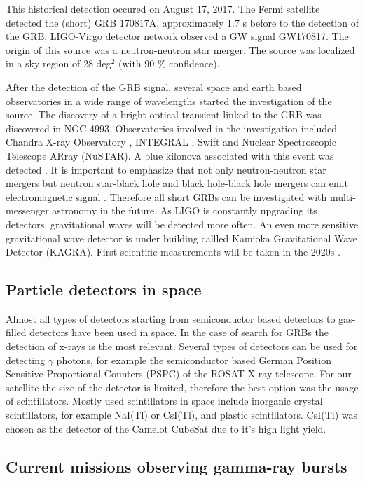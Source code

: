 \documentclass[12pt, a4paper,titlepage]{article}
\numberwithin{equation}{section}
\numberwithin{figure}{section}
\begin{document}
This historical detection occured on August 17, 2017. The Fermi satellite detected the (short) GRB 170817A, approximately 1.7 s before to the detection of the GRB, LIGO-Virgo detector network observed a GW signal GW170817. The origin of this source was a neutron-neutron star merger. The source was localized  in a sky region of 28 deg$^{2}$ (with 90 \% confidence). 

After the detection of the GRB signal, several space and earth based observatories in a wide range of wavelengths started the investigation of the source. The discovery of a bright optical transient linked to the GRB was discovered in NGC 4993. Observatories involved in the investigation included Chandra X-ray Observatory \cite{grb23}, INTEGRAL \cite{grb22}, Swift and Nuclear Spectroscopic Telescope ARray (NuSTAR). A blue kilonova associated with this event was detected \cite{grb24}. It is important to emphasize that not only neutron-neutron star mergers but neutron star-black hole and black hole-black hole mergers can emit electromagnetic signal \cite{grb25}. Therefore all short GRBs can be investigated with multi-messenger astronomy in the future. As LIGO is constantly upgrading its detectors, gravitational waves will be detected more often. An even more sensitive gravitational wave detector is under building callled Kamioka Gravitational Wave Detector (KAGRA). First scientific measurements will be taken in the 2020s \cite{grb26}.

\subsection{Particle detectors in space}

Almost all types of detectors starting from semiconductor based detectors to gas-filled detectors have been used in space. In the case of search for GRBs the detection of x-rays is the most relevant. Several types of detectors can be used for detecting $\gamma$ photons\cite{grb30}, for example the semiconductor based  German Position Sensitive Proportional Counters (PSPC) of the ROSAT X-ray telescope. For our satellite the size of the detector is limited, therefore the best option was the usage of scintillators. Mostly used scintillators in space include inorganic crystal scintillators, for example NaI(Tl) or CsI(Tl), and plastic scintillators. CsI(Tl) was chosen as the detector of the Camelot CubeSat due to it's high light yield.

\subsection{Current missions observing gamma-ray bursts}
\end{document}
